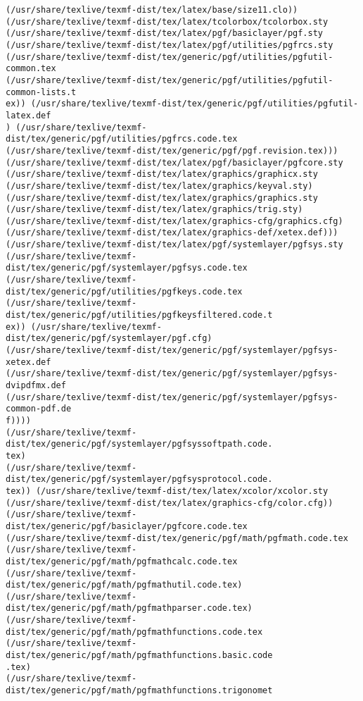 \documentclass[11pt]{article}
\begin{document}
\begin{Verbatim}[commandchars=\\\{\}]
(/usr/share/texlive/texmf-dist/tex/latex/base/size11.clo))
(/usr/share/texlive/texmf-dist/tex/latex/tcolorbox/tcolorbox.sty
(/usr/share/texlive/texmf-dist/tex/latex/pgf/basiclayer/pgf.sty
(/usr/share/texlive/texmf-dist/tex/latex/pgf/utilities/pgfrcs.sty
(/usr/share/texlive/texmf-dist/tex/generic/pgf/utilities/pgfutil-common.tex
(/usr/share/texlive/texmf-dist/tex/generic/pgf/utilities/pgfutil-common-lists.t
ex)) (/usr/share/texlive/texmf-dist/tex/generic/pgf/utilities/pgfutil-latex.def
) (/usr/share/texlive/texmf-dist/tex/generic/pgf/utilities/pgfrcs.code.tex
(/usr/share/texlive/texmf-dist/tex/generic/pgf/pgf.revision.tex)))
(/usr/share/texlive/texmf-dist/tex/latex/pgf/basiclayer/pgfcore.sty
(/usr/share/texlive/texmf-dist/tex/latex/graphics/graphicx.sty
(/usr/share/texlive/texmf-dist/tex/latex/graphics/keyval.sty)
(/usr/share/texlive/texmf-dist/tex/latex/graphics/graphics.sty
(/usr/share/texlive/texmf-dist/tex/latex/graphics/trig.sty)
(/usr/share/texlive/texmf-dist/tex/latex/graphics-cfg/graphics.cfg)
(/usr/share/texlive/texmf-dist/tex/latex/graphics-def/xetex.def)))
(/usr/share/texlive/texmf-dist/tex/latex/pgf/systemlayer/pgfsys.sty
(/usr/share/texlive/texmf-dist/tex/generic/pgf/systemlayer/pgfsys.code.tex
(/usr/share/texlive/texmf-dist/tex/generic/pgf/utilities/pgfkeys.code.tex
(/usr/share/texlive/texmf-dist/tex/generic/pgf/utilities/pgfkeysfiltered.code.t
ex)) (/usr/share/texlive/texmf-dist/tex/generic/pgf/systemlayer/pgf.cfg)
(/usr/share/texlive/texmf-dist/tex/generic/pgf/systemlayer/pgfsys-xetex.def
(/usr/share/texlive/texmf-dist/tex/generic/pgf/systemlayer/pgfsys-dvipdfmx.def
(/usr/share/texlive/texmf-dist/tex/generic/pgf/systemlayer/pgfsys-common-pdf.de
f))))
(/usr/share/texlive/texmf-dist/tex/generic/pgf/systemlayer/pgfsyssoftpath.code.
tex)
(/usr/share/texlive/texmf-dist/tex/generic/pgf/systemlayer/pgfsysprotocol.code.
tex)) (/usr/share/texlive/texmf-dist/tex/latex/xcolor/xcolor.sty
(/usr/share/texlive/texmf-dist/tex/latex/graphics-cfg/color.cfg))
(/usr/share/texlive/texmf-dist/tex/generic/pgf/basiclayer/pgfcore.code.tex
(/usr/share/texlive/texmf-dist/tex/generic/pgf/math/pgfmath.code.tex
(/usr/share/texlive/texmf-dist/tex/generic/pgf/math/pgfmathcalc.code.tex
(/usr/share/texlive/texmf-dist/tex/generic/pgf/math/pgfmathutil.code.tex)
(/usr/share/texlive/texmf-dist/tex/generic/pgf/math/pgfmathparser.code.tex)
(/usr/share/texlive/texmf-dist/tex/generic/pgf/math/pgfmathfunctions.code.tex
(/usr/share/texlive/texmf-dist/tex/generic/pgf/math/pgfmathfunctions.basic.code
.tex)
(/usr/share/texlive/texmf-dist/tex/generic/pgf/math/pgfmathfunctions.trigonomet

\end{Verbatim}
\end{document}
